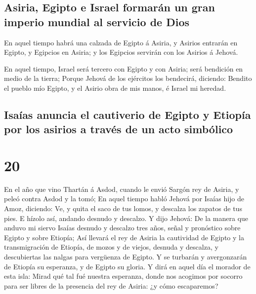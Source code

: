 \hypertarget{asiria-egipto-e-israel-formaruxe1n-un-gran-imperio-mundial-al-servicio-de-dios}{%
\subsection{Asiria, Egipto e Israel formarán un gran imperio mundial al
servicio de
Dios}\label{asiria-egipto-e-israel-formaruxe1n-un-gran-imperio-mundial-al-servicio-de-dios}}

 En aquel tiempo habrá una calzada de Egipto á Asiria, y
Asirios entrarán en Egipto, y Egipcios en Asiria; y los Egipcios
servirán con los Asirios á Jehová.

 En aquel tiempo, Israel será tercero con Egipto y con
Asiria; será bendición en medio de la tierra;  Porque
Jehová de los ejércitos los bendecirá, diciendo: Bendito el pueblo mío
Egipto, y el Asirio obra de mis manos, é Israel mi heredad.

\hypertarget{isauxedas-anuncia-el-cautiverio-de-egipto-y-etiopuxeda-por-los-asirios-a-travuxe9s-de-un-acto-simbuxf3lico}{%
\subsection{Isaías anuncia el cautiverio de Egipto y Etiopía por los
asirios a través de un acto
simbólico}\label{isauxedas-anuncia-el-cautiverio-de-egipto-y-etiopuxeda-por-los-asirios-a-travuxe9s-de-un-acto-simbuxf3lico}}

\hypertarget{section-23-20}{%
\section{20}\label{section-23-20}}

 En el año que vino Thartán á Asdod, cuando le envió
Sargón rey de Asiria, y peleó contra Asdod y la tomó;  En
aquel tiempo habló Jehová por Isaías hijo de Amoz, diciendo: Ve, y quita
el saco de tus lomos, y descalza los zapatos de tus pies. E hízolo así,
andando desnudo y descalzo.  Y dijo Jehová: De la manera
que anduvo mi siervo Isaías desnudo y descalzo tres años, señal y
pronóstico sobre Egipto y sobre Etiopía;  Así llevará el
rey de Asiria la cautividad de Egipto y la transmigración de Etiopía, de
mozos y de viejos, desnuda y descalza, y descubiertas las nalgas para
vergüenza de Egipto.  Y se turbarán y avergonzarán de
Etiopía su esperanza, y de Egipto su gloria.  Y dirá en
aquel día el morador de esta isla: Mirad qué tal fué nuestra esperanza,
donde nos acogimos por socorro para ser libres de la presencia del rey
de Asiria: ¿y cómo escaparemos?

